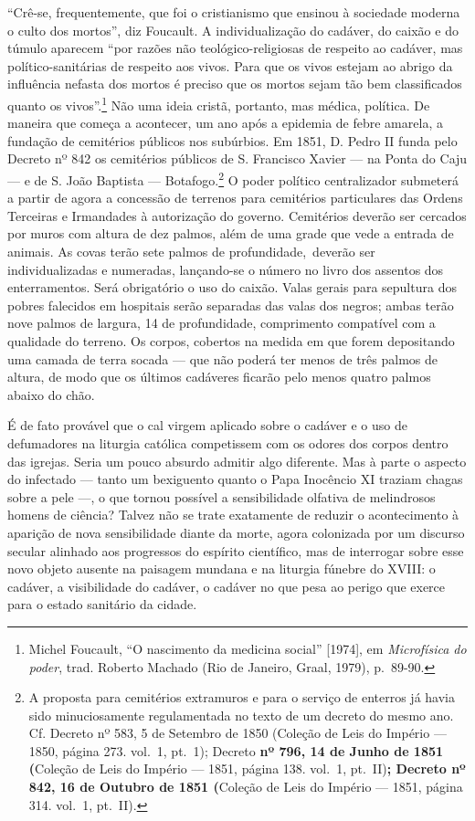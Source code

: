 ``Crê-se, frequentemente, que foi o cristianismo que ensinou à sociedade
moderna o culto dos mortos'', diz Foucault. A individualização do
cadáver, do caixão e do túmulo aparecem ``por razões não
teológico-religiosas de respeito ao cadáver, mas político-sanitárias de
respeito aos vivos. Para que os vivos estejam ao abrigo da influência
nefasta dos mortos é preciso que os mortos sejam tão bem classificados
quanto os vivos''.\footnote{Michel Foucault, ``O nascimento da medicina
  social'' {[}1974{]}, em \textit{Microfísica do poder}, trad. Roberto
  Machado (Rio de Janeiro, Graal, 1979), p.~89-90.} Não uma ideia
cristã, portanto, mas médica, política. De maneira que começa a
acontecer, um ano após a epidemia de febre amarela, a fundação de
cemitérios públicos nos subúrbios. Em 1851, D. Pedro II funda pelo
Decreto nº 842 os cemitérios públicos de S. Francisco Xavier --- na Ponta
do Caju --- e de S. João Baptista --- Botafogo.\footnote{A proposta para
  cemitérios extramuros e para o serviço de enterros já havia sido
  minuciosamente regulamentada no texto de um decreto do mesmo ano. Cf.
  Decreto nº 583, 5 de Setembro de 1850 (Coleção de Leis do Império ---
  1850, página 273. vol.~1, pt.~1); Decreto \textbf{nº 796, 14 de Junho
  de 1851 (}Coleção de Leis do Império --- 1851, página 138. vol.~1,
  pt.~II)\textbf{; Decreto nº 842, 16 de Outubro de 1851 (}Coleção de
  Leis do Império --- 1851, página 314. vol.~1, pt.~II).} O poder
político centralizador submeterá a partir de agora a concessão de
terrenos para cemitérios particulares das Ordens Terceiras e Irmandades
à autorização do governo. Cemitérios deverão ser cercados por muros com
altura de dez palmos, além de uma grade que vede a entrada de animais.
As covas terão sete palmos de profundidade,~deverão ser individualizadas
e numeradas, lançando-se o número no livro dos assentos dos
enterramentos. Será obrigatório o uso do caixão. Valas gerais para
sepultura dos pobres falecidos em hospitais serão separadas das valas
dos negros; ambas terão nove palmos de largura, 14 de profundidade,
comprimento compatível com a qualidade do terreno. Os corpos, cobertos
na medida em que forem depositando uma camada de terra socada --- que não
poderá ter menos de três palmos de altura, de modo que os últimos
cadáveres ficarão pelo menos quatro palmos abaixo do chão.

É de fato provável que o cal virgem aplicado sobre o cadáver e o uso de
defumadores na liturgia católica competissem com os odores dos corpos
dentro das igrejas. Seria um pouco absurdo admitir algo diferente. Mas à
parte o aspecto do infectado --- tanto um bexiguento quanto o Papa
Inocêncio XI traziam chagas sobre a pele ---, o que tornou possível a
sensibilidade olfativa de melindrosos homens de ciência? Talvez não se
trate exatamente de reduzir o acontecimento à aparição de nova
sensibilidade diante da morte, agora colonizada por um discurso secular
alinhado aos progressos do espírito científico, mas de interrogar sobre
esse novo objeto ausente na paisagem mundana e na liturgia fúnebre do
XVIII: o cadáver, a visibilidade do cadáver, o cadáver no que pesa ao
perigo que exerce para o estado sanitário da cidade.

